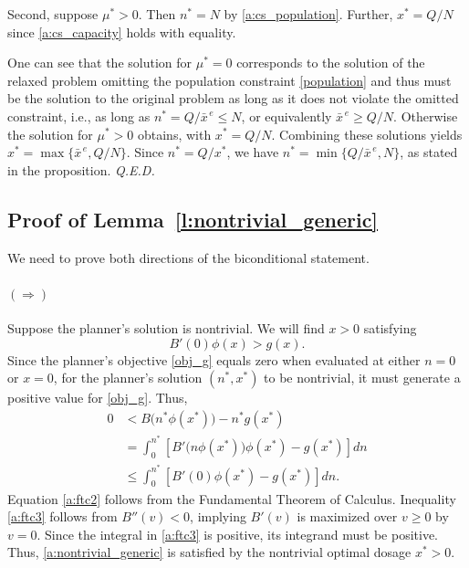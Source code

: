 \documentclass[12pt]{article}
\renewcommand{\qed}{{\it Q.E.D.}}
\newcommand{\efficacy}{\phi}
\newcommand{\general}{g}
\newcommand{\benefit}{B}
\newcommand{\xunitbar}{\bar{x}^{\,e}}
\begin{document}
Second, suppose $\mu^* > 0$. Then $n^* = N$ by
\eqref{a:cs_population}. Further, $x^* = Q/N$ since
\eqref{a:cs_capacity} holds with equality.

One can see that the solution for $\mu^* = 0$ corresponds to the
solution of the relaxed problem omitting the population constraint
\eqref{population} and thus must be the solution to the original
problem as long as it does not violate the omitted constraint, i.e.,
as long as $n^* = Q / \xunitbar \leq N$, or equivalently $\xunitbar
\geq Q / N$. Otherwise the solution for $\mu^* > 0$ obtains, with $x^*
= Q/N$. Combining these solutions yields $x^* = \max \{ \xunitbar, Q/N
\}$. Since $n^* = Q/x^*$, we have $n^* = \min \{ Q/\xunitbar, N \}$,
as stated in the proposition. \qed


\subsection*{Proof of Lemma~\ref{l:nontrivial_generic}}

We need to prove both directions of the biconditional
statement.

\paragraph{$(\Longrightarrow)$}

Suppose the planner's solution is nontrivial. We will find $x > 0$
satisfying
\begin{equation}
\label{a:nontrivial_generic}
B'(0) \efficacy(x) > \general(x).
\end{equation}
Since the planner's objective \eqref{obj_g} equals zero when evaluated
at either $n = 0$ or $x = 0$, for the planner's solution $(n^*, x^*)$
to be nontrivial, it must generate a positive value for
\eqref{obj_g}. Thus,
\begin{align}
0 & < \benefit \bigl( n^*\efficacy(x^*) \bigr) - n^* \general(x^*) \label{a:ftc1} \\
& = \int_0^{n^*} \left[ \benefit' \!\bigl( n\efficacy(x^*) \bigr) \efficacy(x^*) - \general(x^*) \right] dn \label{a:ftc2} \\
& \leq \int_0^{n^*} \left[ \benefit'(0) \efficacy(x^*) - \general(x^*) \right] dn. \label{a:ftc3} 
\end{align} 
Equation \eqref{a:ftc2} follows from the Fundamental Theorem of
Calculus.  Inequality \eqref{a:ftc3} follows from $\benefit''(v) < 0$,
implying $\benefit'(v)$ is maximized over $v \geq 0$ by $v = 0$. Since
the integral in \eqref{a:ftc3} is positive, its integrand must be
positive. Thus, \eqref{a:nontrivial_generic} is satisfied by the
nontrivial optimal dosage $x^* > 0$.
\end{document}
